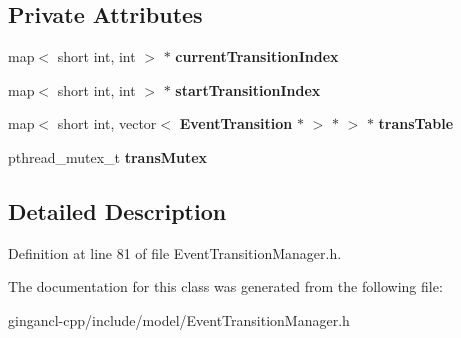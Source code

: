 \subsection*{Private Attributes}
\begin{CompactItemize}
\item 
map$<$ short int, int $>$ $\ast$ {\bf currentTransitionIndex}\label{classbr_1_1pucrio_1_1telemidia_1_1ginga_1_1ncl_1_1model_1_1event_1_1transition_1_1EventTransitionManager_676cacf80488c6548378e7016fdcd8cf}

\item 
map$<$ short int, int $>$ $\ast$ {\bf startTransitionIndex}\label{classbr_1_1pucrio_1_1telemidia_1_1ginga_1_1ncl_1_1model_1_1event_1_1transition_1_1EventTransitionManager_f1017d1c97debd4d8a8f21a468987634}

\item 
map$<$ short int, vector$<$ {\bf EventTransition} $\ast$ $>$ $\ast$ $>$ $\ast$ {\bf transTable}\label{classbr_1_1pucrio_1_1telemidia_1_1ginga_1_1ncl_1_1model_1_1event_1_1transition_1_1EventTransitionManager_1de8d9abe3dcfd2a1a9749acbe459477}

\item 
pthread\_\-mutex\_\-t {\bf transMutex}\label{classbr_1_1pucrio_1_1telemidia_1_1ginga_1_1ncl_1_1model_1_1event_1_1transition_1_1EventTransitionManager_ad14dbd000e5203d281b88cbbfca9580}

\end{CompactItemize}


\subsection{Detailed Description}




Definition at line 81 of file EventTransitionManager.h.

The documentation for this class was generated from the following file:\begin{CompactItemize}
\item 
gingancl-cpp/include/model/EventTransitionManager.h\end{CompactItemize}
